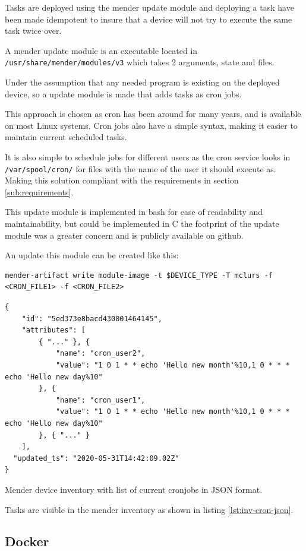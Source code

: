 \documentclass[../../main.tex]{subfiles}
\begin{document}
Tasks are deployed using the mender update module and deploying a task have been made idempotent
to insure that a device will not try to execute the same task twice over.

A mender update module is an executable located in \texttt{/usr/share/mender/modules/v3}
which takes 2 arguments, state and files.

Under the assumption that any needed program is existing on the deployed device,
so a update module is made that adds tasks as cron jobs.

This approach is chosen as cron has been around for many years, and is available on most
Linux systems.
Cron jobs also have a simple syntax, making it easier to maintain current scheduled tasks.

It is also simple to schedule jobs for different users as the cron service looks in
\texttt{/var/spool/cron/} for files with the name of the user it should execute as.
Making this solution compliant with the requirements in section \ref{sub:requirements}.

This update module is implemented in bash for ease of readability and maintainability, but could
be implemented in C the footprint of the update module was a greater concern and is publicly
available on github\cite{mclurs-update-module}.

An update this module can be created like this:
\begin{verbatim}
mender-artifact write module-image -t $DEVICE_TYPE -T mclurs -f <CRON_FILE1> -f <CRON_FILE2>
\end{verbatim}

\begin{listing}[h]
\begin{verbatim}
{
	"id": "5ed373e8bacd430001464145",
	"attributes": [
		{ "..." }, {
			"name": "cron_user2",
			"value": "1 0 1 * * echo 'Hello new month'%10,1 0 * * * echo 'Hello new day%10"
		}, {
			"name": "cron_user1",
			"value": "1 0 1 * * echo 'Hello new month'%10,1 0 * * * echo 'Hello new day%10"
		}, { "..." }
	],
  "updated_ts": "2020-05-31T14:42:09.02Z"
}
\end{verbatim}
\caption{Mender device inventory with list of current cronjobs in JSON format.}
\label{lst:inv-cron-json}
\end{listing}

Tasks are visible in the mender inventory as shown in listing \ref{lst:inv-cron-json}.


\subsection{Docker}%
\label{sub:docker}
\end{document}
